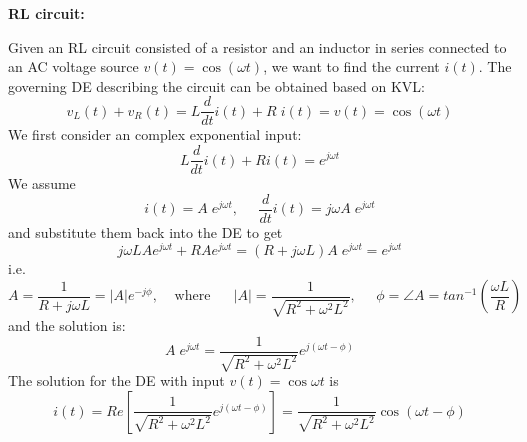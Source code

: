 \documentclass{article}
\begin{document}
{\bf RL circuit:}

Given an RL circuit consisted of a resistor and an inductor in 
series connected to an AC voltage source $v(t)=\cos(\omega t)$, we
want to find the current $i(t)$. The governing DE describing the 
circuit can be obtained based on KVL:
\begin{equation}
  v_L(t)+v_R(t)=L\frac{d}{dt}i(t)+R\;i(t)=v(t)=\cos(\omega t)
\end{equation}
We first consider an complex exponential input:
\begin{equation}	
  L\frac{d}{dt}i(t)+Ri(t)=e^{j\omega t}
\end{equation}
We assume
\begin{equation} 
  i(t)=A\;e^{j\omega t},\;\;\;\;\;\frac{d}{dt}i(t)=j\omega A\;e^{j\omega t} 
\end{equation}
and substitute them back into the DE to get
\begin{equation}
  j\omega L A e^{j\omega t}+RA e^{j\omega t}
  =(R+j\omega L)A\; e^{j\omega t}=e^{j\omega t} 
\end{equation}
i.e.
\begin{equation}
  A=\frac{1}{R+j\omega L}=|A|e^{-j\phi},\;\;\;\;\mbox{where}
  \;\;\;\;\;\;|A|=\frac{1}{\sqrt{R^2+\omega^2 L^2}},\;\;\;\;\;
  \phi=\angle A=tan^{-1}\left(\frac{\omega L}{R}\right)	
\end{equation}
and the solution is:
\begin{equation}
  A\;e^{j\omega t}=\frac{1}{\sqrt{R^2+\omega^2 L^2}} e^{j(\omega t-\phi)} 
\end{equation}
The solution for the DE with input $v(t)=\cos \omega t$ is
\begin{equation}
  i(t)=Re\left[\frac{1}{\sqrt{R^2+\omega^2 L^2}} e^{j(\omega t-\phi)}\right]
  =\frac{1}{\sqrt{R^2+\omega^2 L^2}} \cos(\omega t-\phi)
\end{equation}
\end{document}
